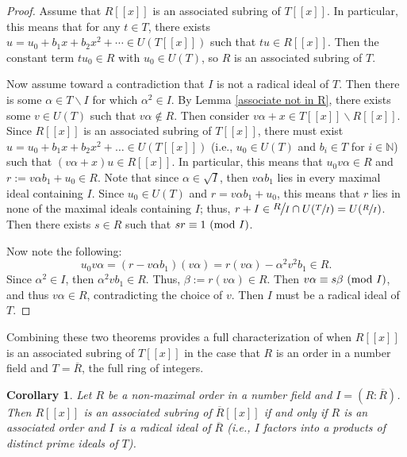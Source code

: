 \documentclass[12pt]{amsart}
\newtheorem{corollary}[theorem]{Corollary}
\theoremstyle{definition}
\newcommand{\bN}{\mathbb N}
\newcommand{\Rbar}{{\overline{R}}}
\newcommand{\modulo}[1]{\textup{ (mod }#1)}
\newcommand{\quot}[2]{\large\sfrac{#1}{#2}\normalsize}
\begin{document}
\begin{proof}
    Assume that $R[[x]]$ is an associated subring of $T[[x]]$. In particular, this means that for any $t\in T$, there exists $u=u_0+b_1x+b_2x^2+\cdots\in U(T[[x]])$ such that $tu\in R[[x]]$. Then the constant term $tu_0\in R$ with $u_0\in U(T)$, so $R$ is an associated subring of $T$.

    Now assume toward a contradiction that $I$ is not a radical ideal of $T$. Then there is some $\alpha\in T\backslash I$ for which $\alpha^2\in I$. By Lemma \ref{associate not in R}, there exists some $v\in U(T)$ such that $v\alpha\notin R$. Then consider $v\alpha+x\in T[[x]]\backslash R[[x]]$. Since $R[[x]]$ is an associated subring of $T[[x]]$, there must exist $u=u_0+b_1x+b_2x^2+\dots\in U(T[[x]])$ (i.e., $u_0\in U(T)$ and $b_i\in T$ for $i\in\bN$) such that $(v\alpha+x)u\in R[[x]]$. In particular, this means that $u_0v\alpha \in R$ and $r:=v\alpha b_1+u_0\in R$. Note that since $\alpha\in\sqrt{I}$, then $v\alpha b_1$ lies in every maximal ideal containing $I$. Since $u_0\in U(T)$ and $r=v\alpha b_1+u_0$, this means that $r$ lies in none of the maximal ideals containing $I$; thus, $r+I\in \quot{R}{I}\cap U(\sfrac{T}{I})=U(\sfrac{R}{I})$. Then there exists $s\in R$ such that $sr\equiv 1\modulo{I}$.

    Now note the following:
    $$u_0v\alpha=(r-v\alpha b_1)(v\alpha)=r(v\alpha)-\alpha^2 v^2b_1\in R.$$
    Since $\alpha^2\in I$, then $\alpha^2 vb_1\in R$. Thus, $\beta:=r(v\alpha)\in R$. Then $v\alpha\equiv s\beta\modulo{I}$, and thus $v\alpha\in R$, contradicting the choice of $v$. Then $I$ must be a radical ideal of $T$.
\end{proof}

Combining these two theorems provides a full characterization of when $R[[x]]$ is an associated subring of $T[[x]]$ in the case that $R$ is an order in a number field and $T=\Rbar$, the full ring of integers.

\begin{corollary}
    Let $R$ be a non-maximal order in a number field and $I=(R:\Rbar)$. Then $R[[x]]$ is an associated subring of $\Rbar[[x]]$ if and only if $R$ is an associated order and $I$ is a radical ideal of $\Rbar$ (i.e., $I$ factors into a products of distinct prime ideals of $T$).
\end{corollary}
\end{document}
